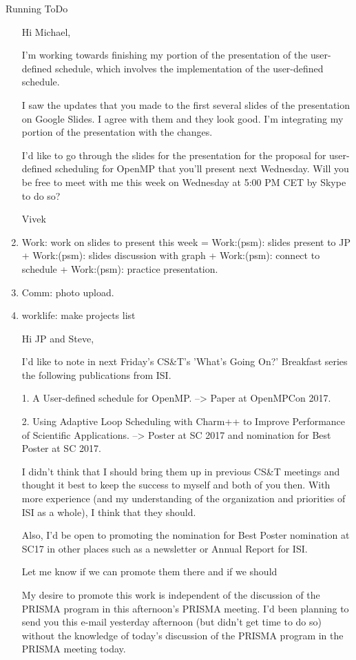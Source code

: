 \begin{columns}
\begin{column}{0.6\linewidth}
\begin{block}{Running ToDo}
\begin{enumerate}
Hi Michael,
        
I'm working towards finishing my portion of the presentation of the user-defined schedule, which involves the implementation of the user-defined schedule.

I saw the updates that you made to the first several slides of the
presentation on Google Slides. I agree with them and they look
good. I'm integrating my portion of the presentation with the
changes. 

I'd like to go through the slides for the presentation for the
proposal for user-defined scheduling for OpenMP that you'll present
next Wednesday. Will you be free to meet with me this week on
Wednesday at 5:00 PM CET by Skype to do so? 

Vivek

      \item \tiny Work: work on slides to present this week =
        Work:(psm): slides present to JP + Work:(psm): slides
        discussion with graph  + Work:(psm): connect to schedule +
        Work:(psm): practice presentation.
      \item \tiny Comm: photo upload. 
      \item \tiny worklife: make projects list


Hi JP and Steve,

I'd like to note in next Friday's CS&T's 'What's Going On?' Breakfast
series the following publications from ISI. 

1. A User-defined schedule for OpenMP. --> Paper at OpenMPCon 2017.

2. Using Adaptive Loop Scheduling with Charm++ to Improve Performance
of Scientific Applications. --> Poster at SC 2017 and nomination for Best
Poster at SC 2017. 

I didn't think that I should bring them up in previous CS&T meetings
and thought it best to keep the success to myself and both of you
then. With more experience (and my understanding of the organization and
priorities of ISI as a whole), I think that they should. 

Also, I'd be open to promoting the nomination for Best Poster
nomination at SC17 in other places such as a newsletter or Annual
Report for ISI. 

Let me know if we can promote them there and if we should 

My desire to promote this work is independent of the discussion of the
PRISMA program in this afternoon's PRISMA meeting. I'd been planning to send you this e-mail yesterday
afternoon (but didn't get time to do so) without the knowledge of
today's discussion of the PRISMA program in the PRISMA meeting today.


\end{enumerate}
\end{block}
\end{column}
\end{columns}
